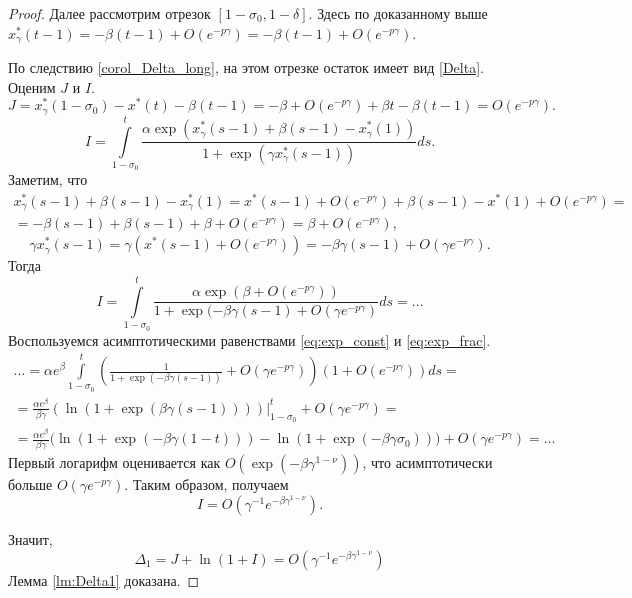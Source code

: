 \begin{proof}
Далее рассмотрим отрезок $[1 - \sigma_0, 1 - \delta]$. Здесь по доказанному выше $x_\gamma^*(t - 1) = -\beta (t-1) + O(e^{-p\gamma}) = -\beta (t-1) + O(e^{-p\gamma})$.

По следствию \eqref{corol_Delta_long}, на этом отрезке остаток имеет вид \eqref{Delta}. Оценим $J$ и $I$.
%
\[
J = x^*_{\gamma}(1 - \sigma_0) - x^*(t) - \beta (t - 1) = -\beta + O(e^{-p\gamma}) + \beta t - \beta(t - 1) = O(e^{-p\gamma}).
\]
%
\[
I = \int\limits_{1 - \sigma_0}^{t}\frac{\alpha\exp(x_{\gamma}^*(s-1)+\beta(s-1)-x_{\gamma}^*(1))}{1 + \exp(\gamma x_{\gamma}^*(s-1))} ds.
\]
Заметим, что
\begin{multline*}
x_{\gamma}^*(s-1)+\beta(s-1)-x_{\gamma}^*(1) = x^*(s - 1) + O(e^{-p\gamma}) + \beta(s - 1) - x^*(1) + O(e^{-p\gamma}) =\\= -\beta(s - 1) + \beta(s - 1) + \beta + O(e^{-p\gamma}) = \beta + O(e^{-p\gamma}),
\end{multline*}
\[
\gamma x^*_{\gamma}(s - 1) = \gamma (x^*(s - 1) + O(e^{-p\gamma})) = -\beta \gamma (s - 1) + O(\gamma e^{-p\gamma}).
\]
Тогда 
\[
I = \int\limits_{1 - \sigma_0}^{t}\frac{\alpha\exp(\beta + O(e^{-p\gamma}))}{1 + \exp(-\beta \gamma (s - 1) + O(\gamma e^{-p\gamma})} ds = \ldots
\]
Воспользуемся асимптотическими равенствами \eqref{eq:exp_const} и \eqref{eq:exp_frac}.
\begin{multline*}
\ldots = \alpha e^{\beta} \int\limits_{1 - \sigma_0}^{t}\left(\frac{1}{1 + \exp(-\beta \gamma (s - 1))} + O(\gamma e^{-p\gamma})\right)(1 + O(e^{-p\gamma})) ds = \\
= \frac{\alpha e^{\beta}}{\beta \gamma} \left(\ln(1 + \exp(\beta \gamma (s - 1)))\right)\bigg\vert_{1 - \sigma_0}^t + O(\gamma e^{-p\gamma}) = \\
= \frac{\alpha e^{\beta}}{\beta \gamma}  \big(\ln(1 + \exp(-\beta \gamma (1 - t))) - \ln(1 + \exp(-\beta \gamma \sigma_0)) \big) + O(\gamma e^{-p\gamma}) = \ldots 
\end{multline*}
%
Первый логарифм оценивается как $O(\exp(-\beta \gamma^{1 - \nu}))$, что асимптотически больше $O(\gamma e^{-p\gamma})$. Таким образом, получаем
\[
I = O(\gamma^{-1} e^{-\beta \gamma^{1 - \nu}}).
\]

Значит,
\begin{equation}
	\label{eq:Delta_step1}
	\Delta_1 = J + \ln(1 + I) = O(\gamma^{-1} e^{-\beta \gamma^{1 - \nu}})
\end{equation}
%
Лемма \ref{lm:Delta1} доказана.

\end{proof}


